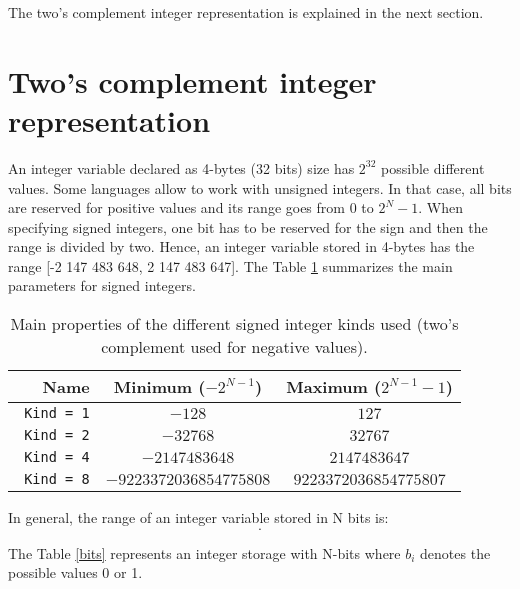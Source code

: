 The two's complement integer representation is explained in the next section. 

 
\newpage
    \section{Two's complement integer representation} \label{sec:TwosComp}

An integer variable declared as 4-bytes (32 bits) size has $ 2^{32} $ possible different values. 
Some languages allow to work with unsigned integers. In that case, 
all bits are reserved for positive values and its range goes from 0 to $ 2^N - 1$. 
When specifying signed integers, one bit has to be reserved for the sign and then the range is divided by two.
Hence, an integer variable stored in 4-bytes has the range  [-2 147 483 648, 2 147 483 647]. 
The Table \ref{tab:propertiesint} summarizes the main parameters for signed integers.

\begin{table}[h]
    \centering
    \begin{tabular}{| r | c | c |}
        
        \hline
        Name  & Minimum ($-2^{N-1}$) & Maximum ($2^{N-1} - 1$)  \\ \hline
        
        \texttt{ Kind = 1}                         & $-128$ & $127$ \\ \hline
        \texttt{ Kind = 2}                      & $-32 768$ & $32 767$ \\ \hline
        \texttt{ Kind = 4}               & $-2 147 483 648$ & $2 147 483 647$ \\ \hline
        \texttt{ Kind = 8}   & $-9 223 372 036 854 775 808$ & $9 223 372 036 854 775 807$ \\ \hline
        
    \end{tabular}                                                       
    \caption{Main properties of the different signed integer kinds used (two's complement used for negative values).}
    \label{tab:propertiesint}
\end{table}

In general, the range of an integer variable stored in N bits is:   
\begin{equation}
    [ -2^{N-1},\: 2^{N-1}-1 ].  
\end{equation}



The Table \ref{bits} represents an integer storage with N-bits where $ b_i $ denotes the possible values 0 or 1. 

